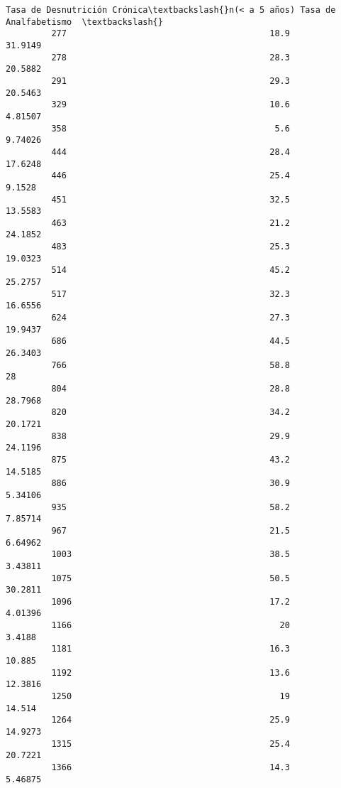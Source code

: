 \documentclass[11pt]{article}
\begin{document}
\begin{Verbatim}[commandchars=\\\{\}]
              Tasa de Desnutrición Crónica\textbackslash{}n(< a 5 años) Tasa de Analfabetismo  \textbackslash{}
         277                                        18.9               31.9149   
         278                                        28.3               20.5882   
         291                                        29.3               20.5463   
         329                                        10.6               4.81507   
         358                                         5.6               9.74026   
         444                                        28.4               17.6248   
         446                                        25.4                9.1528   
         451                                        32.5               13.5583   
         463                                        21.2               24.1852   
         483                                        25.3               19.0323   
         514                                        45.2               25.2757   
         517                                        32.3               16.6556   
         624                                        27.3               19.9437   
         686                                        44.5               26.3403   
         766                                        58.8                    28   
         804                                        28.8               28.7968   
         820                                        34.2               20.1721   
         838                                        29.9               24.1196   
         875                                        43.2               14.5185   
         886                                        30.9               5.34106   
         935                                        58.2               7.85714   
         967                                        21.5               6.64962   
         1003                                       38.5               3.43811   
         1075                                       50.5               30.2811   
         1096                                       17.2               4.01396   
         1166                                         20                3.4188   
         1181                                       16.3                10.885   
         1192                                       13.6               12.3816   
         1250                                         19                14.514   
         1264                                       25.9               14.9273   
         1315                                       25.4               20.7221   
         1366                                       14.3               5.46875   
         

\end{Verbatim}
\end{document}
